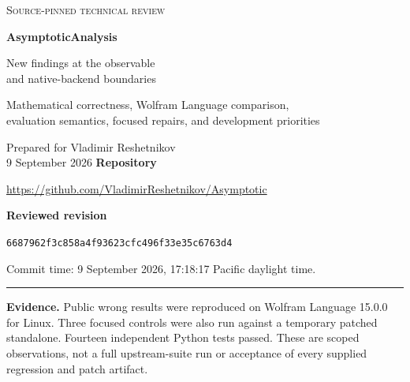 \documentclass[11pt,letterpaper]{article}
\newcommand{\sha}{6687962f3c858a4f93623cfc496f33e35c6763d4}
\begin{document}
\begin{titlepage}
{\color{oliveink}\Large\textsc{Source-pinned technical review}\par}
\vspace{0.65in}
{\color{oliveink}\Huge\bfseries AsymptoticAnalysis\par}
\vspace{0.16in}
{\LARGE New findings at the observable\\and native-backend boundaries\par}
\vspace{0.35in}
{\large Mathematical correctness, Wolfram Language comparison,\\evaluation semantics, focused repairs, and development priorities\par}
\vspace{0.5in}
Prepared for Vladimir Reshetnikov\\
9 September 2026
\vfill
\textbf{Repository}\par
\url{https://github.com/VladimirReshetnikov/Asymptotic}\par
\textbf{Reviewed revision}\par
\texttt{\sha}\par
Commit time: 9 September 2026, 17:18:17 Pacific daylight time.
\medskip\hrule\medskip
\textbf{Evidence.} Public wrong results were reproduced on Wolfram Language
15.0.0 for Linux. Three focused controls were also run against a temporary
patched standalone. Fourteen independent Python tests passed. These are scoped
observations, not a full upstream-suite run or acceptance of every supplied
regression and patch artifact.
\end{titlepage}
\end{document}
